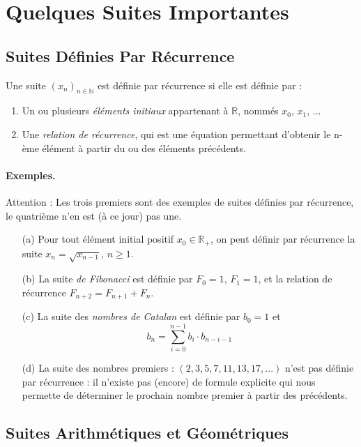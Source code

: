 \documentclass[oneside,11pt,french,table]{book}
\theoremstyle{definition}
\theoremstyle{plain}
\theoremstyle{remark}
\begin{document}
 \section{Quelques Suites Importantes}
 \subsection{Suites Définies Par Récurrence}

 Une suite $(x_n)_{n\in \mathbb{N}}$ est définie par récurrence si elle est définie par :
 \begin{enumerate}
     \item Un ou plusieurs \textit{éléments initiaux} appartenant à $\mathbb{R}$, nommés $x_0$, $x_1$, ...
     \item Une \textit{relation de récurrence}, qui est une équation permettant d'obtenir le n-ème élément à partir du ou des éléments précédents.
 \end{enumerate}
 \pagebreak
 \paragraph{Exemples.}
 Attention : Les trois premiers sont des exemples de suites définies par récurrence, le quatrième n'en est (à ce jour) pas une.
 \begin{enumerate}
     \item[(a)] Pour tout élément initial positif $x_0 \in \mathbb{R}_+$, on peut définir par récurrence la suite $x_n = \sqrt{x_{n-1}}$, $n \geq 1$.
     \item[(b)] La suite \textit{de Fibonacci} est définie par $F_0 = 1$, $F_1 = 1$, et la relation de récurrence $F_{n+2} = F_{n+1} + F_{n}$.
     \item[(c)] La suite des \textit{nombres de Catalan} est définie par $b_0 = 1$ et $$b_n = \sum_{i=0}^{n-1} b_i \cdot  b_{n-i-1}$$
     \item[(d)] La suite des nombres premiers : $(2, 3, 5, 7, 11, 13, 17, ...)$ n'est pas définie par récurrence : il n'existe pas (encore) de formule explicite qui nous permette de déterminer le prochain nombre premier à partir des précédents.
 \end{enumerate}
 
 \subsection{Suites Arithmétiques et Géométriques}
 
\end{document}
